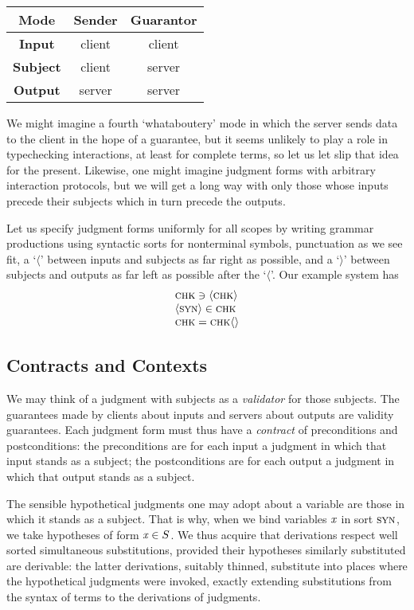 \documentclass[format=acmsmall, screen, review, anonymous, timestamp]{acmart}
\newcommand{\V}[1]{\purple{\mathit{#1}}}
\newcommand{\x}[1]{\V{x_{\mathrm{#1}}}}
\begin{document}
\begin{tabular}{|c||c|c|}
  \hline
  \textbf{Mode} & \textbf{Sender} & \textbf{Guarantor} \\
  \hline \hline
  \textbf{Input} & client & client \\
  \textbf{Subject} & client & server \\
  \textbf{Output} & server & server \\
  \hline
\end{tabular}

We might imagine a fourth `whataboutery' mode in which the server sends data to the client in the hope of a guarantee, but it seems unlikely to play a role in typechecking interactions, at least for complete terms, so let us let slip that idea for the present. Likewise, one might imagine judgment forms with arbitrary interaction protocols, but we will get a long way with only those whose inputs precede their subjects which in turn precede the outputs.

Let us specify judgment forms uniformly for all scopes by writing grammar productions using syntactic sorts for nonterminal symbols, punctuation as we see fit, a `$\langle$' between inputs and subjects as far right as possible, and a `$\rangle$' between subjects and outputs as far left as possible after the `$\langle$'. Our example system has
\[\begin{array}{l}
    \textsc{chk} \ni \langle \textsc{chk} \rangle \\
    \langle \textsc{syn} \rangle \in \textsc{chk} \\
    \textsc{chk} = \textsc{chk} \langle\rangle 
  \end{array}\]


\subsection{Contracts and Contexts}

We may think of a judgment with subjects as a \emph{validator} for those subjects. The guarantees made by clients about inputs and servers about outputs are validity guarantees. Each judgment form must thus have a \emph{contract} of preconditions and postconditions: the preconditions are for each input a judgment in which that input stands as a subject; the postconditions are for each output a judgment in which that output stands as a subject.

The sensible hypothetical judgments one may adopt about a variable are those in which it stands as a subject. That is why, when we bind variables $\x{}$ in sort $\textsc{syn}$, we take hypotheses of form $\x{}\in S$. We thus acquire that derivations respect well sorted simultaneous substitutions, provided their hypotheses similarly substituted are derivable: the latter derivations, suitably thinned, substitute into places where the hypothetical judgments were invoked, exactly extending substitutions from the syntax of terms to the derivations of judgments.
\end{document}
